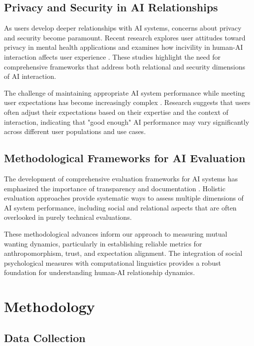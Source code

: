 \documentclass{article}
\begin{document}
\subsection{Privacy and Security in AI Relationships}

As users develop deeper relationships with AI systems, concerns about privacy and security become paramount. Recent research explores user attitudes toward privacy in mental health applications \citep{mentalhealth2025privacy} and examines how incivility in human-AI interaction affects user experience \citep{qi2025assistant}. These studies highlight the need for comprehensive frameworks that address both relational and security dimensions of AI interaction.

The challenge of maintaining appropriate AI system performance while meeting user expectations has become increasingly complex \citep{payne2024ai}. Research suggests that users often adjust their expectations based on their expertise and the context of interaction, indicating that "good enough" AI performance may vary significantly across different user populations and use cases.

\subsection{Methodological Frameworks for AI Evaluation}

The development of comprehensive evaluation frameworks for AI systems has emphasized the importance of transparency and documentation \citep{mitchell2019modelcards, bender2018datastatements}. Holistic evaluation approaches \citep{liang2022helm} provide systematic ways to assess multiple dimensions of AI system performance, including social and relational aspects that are often overlooked in purely technical evaluations.

These methodological advances inform our approach to measuring mutual wanting dynamics, particularly in establishing reliable metrics for anthropomorphism, trust, and expectation alignment. The integration of social psychological measures with computational linguistics provides a robust foundation for understanding human-AI relationship dynamics.

\section{Methodology}

\subsection{Data Collection}
\end{document}
